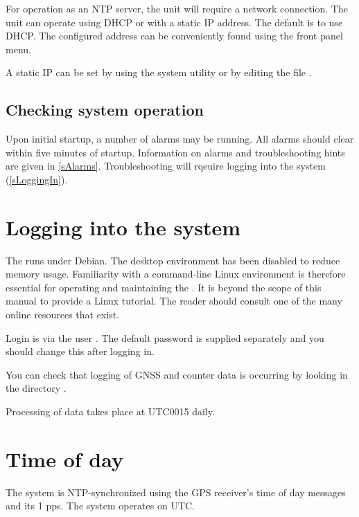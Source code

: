 For operation as an NTP server, the unit will require a network connection.
The unit can operate using DHCP or with
a static IP address. The default is to use DHCP. The configured address can be conveniently found using the 
front panel menu.

A static IP can be set by using the system utility  or by editing the file 
.

\subsection{Checking system operation}

Upon initial startup, a number of alarms may be running. 
All alarms should clear within five minutes of startup.
Information on alarms and troubleshooting hints are given in \ref{sAlarms}. Troubleshooting
will rqeuire logging into the system (\ref{sLoggingIn}).


\section{Logging into the system \label{sLoggingIn}}

The \sysname{} runs under Debian. The desktop environment has been disabled to reduce memory usage.
Familiarity with a command-line Linux environment is therefore essential for operating and maintaining
the \sysname{}. It is beyond the scope of this manual to provide a Linux tutorial. The reader should 
consult one of the many online resources that exist.

Login is via the user . The default password is supplied separately and you should change
this after logging in.

You can check that logging of GNSS and counter data is occurring by looking in the directory 
.

Processing of data takes place at UTC0015 daily. 

\section{Time of day}

The system is NTP-synchronized using the GPS receiver's time of day messages and its 1 pps. The system operates on UTC. 
	


